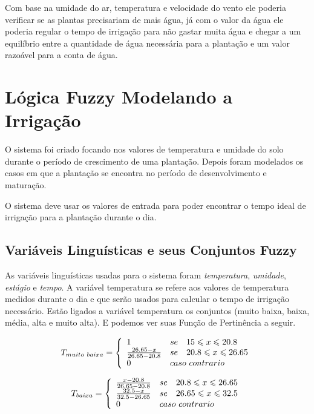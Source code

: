 \documentclass[
	article,			%
	11pt,				%
	oneside,			%
	a4paper,			%
	english,			%
	brazil,				%
	sumario=tradicional
	]{abntex2}
\begin{document}
\begin{multicols}{2}
Com base na umidade do ar, temperatura e velocidade do vento ele poderia verificar se as plantas precisariam de mais água, já com o valor da água ele poderia regular o tempo de irrigação para não gastar muita água e chegar a um equilíbrio entre a quantidade de água necessária para a plantação e um valor razoável para a conta de água.


\section{Lógica Fuzzy Modelando a Irrigação}

O sistema foi criado focando nos valores de temperatura e umidade do solo durante o período de crescimento de uma plantação. Depois foram modelados os casos em que a plantação se encontra no período de desenvolvimento e maturação.

O sistema deve usar os valores de entrada para poder encontrar o tempo ideal de irrigação para a plantação durante o dia.

\subsection{Variáveis Linguísticas e seus Conjuntos Fuzzy}
As variáveis linguísticas usadas para o sistema foram \textit{temperatura}, \textit{umidade}, \textit{estágio} e \textit{tempo}.
A variável temperatura se refere aos valores de temperatura medidos durante o dia e que serão usados para calcular o tempo de irrigação necessário. Estão ligados a variável temperatura os conjuntos (muito baixa, baixa, média, alta e muito alta). E podemos ver suas Função de Pertinência a seguir.

$$
  T_{muito~baixa} = \left\{
  \begin{array}{lll}
  1 & se & 15 \leqslant x \leqslant 20.8 \\
  \frac{26.65 - x}{26.65 - 20.8} & se & 20.8 \leqslant x \leqslant 26.65 \\
  0 & \multicolumn{2}{l}{caso~contrario}
  \end{array}
  \right.
$$

$$
  T_{baixa} = \left\{
  \begin{array}{lll}
  \frac{x - 20.8}{26.65 - 20.8} & se & 20.8 \leqslant x \leqslant 26.65 \\
  \frac{32.5 - x}{32.5 - 26.65} & se & 26.65 \leqslant x \leqslant 32.5 \\
  0 & \multicolumn{2}{l}{caso~contrario}
  \end{array}
  \right.
$$


\end{multicols}
\end{document}
